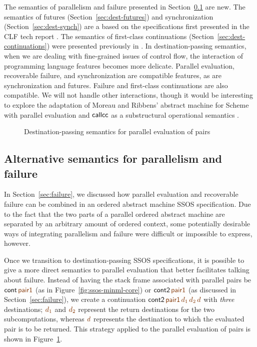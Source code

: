 The semantics of parallelism and failure presented in
Section~\ref{sec:modular-parallelism} are new. The semantics of
futures (Section~\ref{sec:dest-futures}) and synchronization
(Section~\ref{sec:dest-synch}) are a based on the specifications first
presented in the CLF tech report \cite{cervesato02concurrent}. The
semantics of first-class continuations
(Section~\ref{sec:dest-continuations}) were presented previously in
\cite{pfenning04substructural,pfenning09substructural}. In
destination-passing semantics, when we are dealing with fine-grained
issues of control flow, the interaction of programming language
features becomes more delicate.  Parallel evaluation, recoverable
failure, and synchronization are compatible features, as are
synchronization and futures. Failure and first-class continuations are
also compatible. We will not handle other interactions, though it
would be interesting to explore the adaptation of Moreau and Ribbens'
abstract machine for Scheme with parallel evaluation and ${\sf
  callcc}$ as a substructural operational semantics
\cite{moreau96semantics}.

\begin{figure}
\caption{Destination-passing semantics for parallel evaluation of pairs}
\label{fig:dest-pair}
\end{figure}

\subsection{Alternative semantics for parallelism and failure}
\label{sec:modular-parallelism}

In Section~\ref{sec:failure}, we discussed how parallel evaluation and
recoverable failure can be combined in an ordered abstract machine
SSOS specification. Due to the fact that the two parts of a parallel
ordered abstract machine are separated by an arbitrary amount of
ordered context, some potentially desirable ways of
integrating parallelism and failure were difficult or impossible to
express, however. 

Once we transition to destination-passing SSOS specifications, it is
possible to give a more direct semantics to parallel evaluation that
better facilitates talking about failure. Instead of having the stack
frame associated with parallel pairs be ${\sf cont}\,\lf{\sf pair1}$ (as
in Figure~\ref{fig:ssos-minml-core}) or ${\sf cont2}\,\lf{\sf pair1}$ (as
discussed in Section~\ref{sec:failure}), we create a continuation
${\sf cont2}\,\lf{\sf pair1}\,\lf{d_1}\,\lf{d_2}\,\lf{d}$ 
with {\it three} destinations;
$\lf{d_1}$ and $\lf{d_2}$ represent the return destinations for the two
subcomputations, whereas $\lf{d}$ represents the destination to which the
evaluated pair is to be returned. This strategy applied to the
parallel evaluation of pairs is shown in Figure~\ref{fig:dest-pair}.

